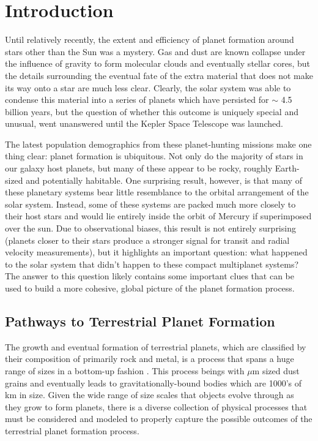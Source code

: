 \chapter {Introduction}

Until relatively recently, the extent and efficiency of planet formation around stars other than the Sun was a mystery. Gas and dust are known collapse under the influence of gravity to form molecular clouds and eventually stellar cores, but the details surrounding the eventual fate of the extra material that does not make its way onto a star are much less clear. Clearly, the solar system was able to condense this material into a series of planets which have persisted for $\sim$ 4.5 billion years, but the question of whether this outcome is uniquely special and unusual, went unanswered until the Kepler Space Telescope was launched.

The latest population demographics from these planet-hunting missions make one thing clear: planet formation is ubiquitous. Not only do the majority of stars in our galaxy host planets, but many of these appear to be rocky, roughly Earth-sized and potentially habitable. One surprising result, however, is that many of these planetary systems bear little resemblance to the orbital arrangement of the solar system. Instead, some of these systems are packed much more closely to their host stars and would lie entirely inside the orbit of Mercury if superimposed over the sun. Due to observational biases, this result is not entirely surprising (planets closer to their stars produce a stronger signal for transit and radial velocity measurements), but it highlights an important question: what happened to the solar system that didn't happen to these compact multiplanet systems? The answer to this question likely contains some important clues that can be used to build a more cohesive, global picture of the planet formation process.

\section{Pathways to Terrestrial Planet Formation}

The growth and eventual formation of terrestrial planets, which are classified by their composition of primarily rock and metal, is a process that spans a huge range of sizes in a bottom-up fashion \cite{safronov72}. This process beings with $\mu$m sized dust grains and eventually leads to gravitationally-bound bodies which are 1000's of km in size. Given the wide range of size scales that objects evolve through as they grow to form planets, there is a diverse collection of physical processes that must be considered and modeled to properly capture the possible outcomes of the terrestrial planet formation process.


